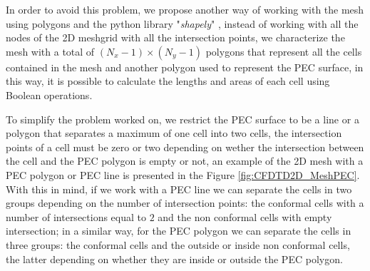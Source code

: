 \documentclass[12pt, oneside]{book}
\begin{document}
In order to avoid this problem, we propose another way of working with the mesh using polygons and the python library "\textit{shapely}" \cite{Gillies_Shapely_2024}, instead of working with all the nodes of the 2D meshgrid with all the intersection points, we characterize the mesh with a total of $(N_x - 1) \times (N_y - 1)$ polygons that represent all the cells contained in the mesh and another polygon used to represent the PEC surface, in this way, it is possible to calculate the lengths and areas of each cell using Boolean operations. 

To simplify the problem worked on, we restrict the PEC surface to be a line or a polygon that separates a maximum of one cell into two cells, the intersection points of a cell must be zero or two depending on wether the intersection between the cell and the PEC polygon is empty or not, an example of the 2D mesh with a PEC polygon or PEC line is presented in the Figure \ref{fig:CFDTD2D_MeshPEC}. With this in mind, if we work with a PEC line we can separate the cells in two groups depending on the number of intersection points: the conformal cells with a number of intersections equal to $2$ and the non conformal cells with empty intersection; in a similar way, for the PEC polygon we can separate the cells in three groups: the conformal cells and the outside or inside non conformal cells, the latter depending on whether they are inside or outside the PEC polygon.
\end{document}
